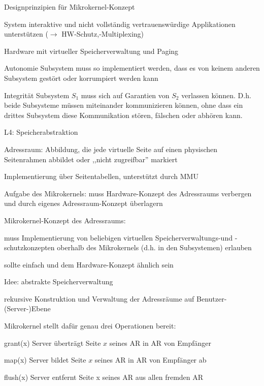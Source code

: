 \documentclass[a4paper]{article}
\begin{document}
\begin{multicols}{3}
    Designprinzipien für Mikrokernel-Konzept
    \begin{enumerate*}
        \item System interaktive und nicht vollständig vertrauenswürdige Applikationen unterstützen ($\rightarrow$ HW-Schutz,-Multiplexing)
        \item Hardware mit virtueller Speicherverwaltung und Paging
    \end{enumerate*}

    \begin{description*}
        \item[Autonomie] Subsystem muss so implementiert werden, dass es von keinem anderen Subsystem gestört oder korrumpiert werden kann
        \item[Integrität] Subsystem $S_1$ muss sich auf Garantien von $S_2$ verlassen können. D.h. beide Subsysteme müssen miteinander kommunizieren können, ohne dass ein drittes Subsystem diese Kommunikation stören, fälschen oder abhören kann.
    \end{description*}

    L4: Speicherabstraktion
    \begin{itemize*}
        \item Adressraum: Abbildung, die jede virtuelle Seite auf einen physischen Seitenrahmen abbildet oder ,,nicht zugreifbar'' markiert
        \item Implementierung über Seitentabellen, unterstützt durch MMU
        \item Aufgabe des Mikrokernels: muss Hardware-Konzept des Adressraums verbergen und durch eigenes Adressraum-Konzept überlagern
        \item Mikrokernel-Konzept des Adressraums:
        \begin{itemize*}
            \item muss Implementierung von beliebigen virtuellen Speicherverwaltungs-und -schutzkonzepten oberhalb des Mikrokernels (d.h. in den Subsystemen) erlauben
            \item sollte einfach und dem Hardware-Konzept ähnlich sein
        \end{itemize*}
        \item Idee: abstrakte Speicherverwaltung
        \begin{itemize*}
            \item rekursive Konstruktion und Verwaltung der Adressräume auf Benutzer-(Server-)Ebene
            \item Mikrokernel stellt dafür genau drei Operationen bereit:
        \end{itemize*}
    \end{itemize*}
    \begin{description*}
        \item[grant(x)] Server überträgt Seite $x$ seines AR in AR von Empfänger
        \item[map(x)] Server bildet Seite $x$ seines AR in AR von Empfänger ab
        \item[flush(x)] Server entfernt Seite x seines AR aus allen fremden AR
    \end{description*}


\end{multicols}
\end{document}
